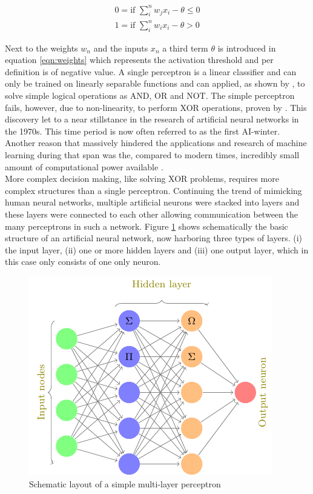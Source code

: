 \begin{subequations}
 \begin{align}
  0 = \mbox{if } \sum_i^n w_j x_i - \theta \leq 0 \\
  1 = \mbox{if } \sum_i^n w_i x_i - \theta > 0
 \end{align}
 \label{eqn:weights}
\end{subequations}

\noindent
Next to the weights $w_n$ and the inputs $x_n$ a third term $\theta$ is introduced in equation
\ref{eqn:weights} which represents the activation threshold and per definition is of negative value. A single
perceptron is a linear classifier and can only be trained on linearly separable functions and can applied, as
shown by \cite{rosenblatt1961}, to solve simple logical operations as AND, OR and NOT. The simple perceptron
fails, however, due to non-linearity, to perform XOR operations, proven by \cite{marvin1969}. This discovery
let to a near stillstance in the research of artificial neural networks in the 1970s. This time period is now
often referred to as the first AI-winter. Another reason that massively hindered the applications and research
of machine learning during that span was the, compared to
modern times, incredibly small amount of computational power available \cite{nguyen1990truck}. \\
More complex decision making, like solving XOR problems, requires more complex structures than a single
perceptron. Continuing the trend of mimicking human neural networks, multiple artificial neurons were stacked
into layers and these layers were connected to each other allowing communication between the many perceptrons
in such a network. Figure \ref{fig:nn} shows schematically the basic structure of an artificial neural network,
now harboring three types of layers. (i) the input layer, (ii) one or more hidden layers and (iii) one output
layer, which in this case only consists of one only neuron.

\begin{figure}[H]
\centering
\includegraphics[height=.25\textheight, width=.5\textwidth]{Figures/neuralnet}
\decoRule
\caption[Schematic layout of a simple multi-layer perceptron]{Schematic layout of a simple multi-layer perceptron}
\label{fig:nn}
\end{figure}

